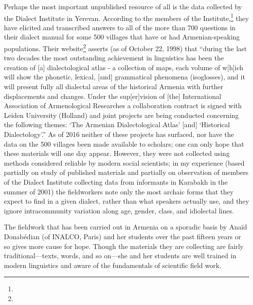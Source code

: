 Perhaps the most important unpublished resource of all is the data collected by the Dialect Institute in Yerevan. According to the members of the Institute,\footnote{} they  have elicited and transcribed answers to all of the more than 700 questions in their dialect manual  for some 500 villages that have or had Armenian-speaking populations. Their website\footnote{}  asserts (as of October 22, 1998) that “during the last two decades the most outstanding achievement in linguistics has been the creation of [a] dialectological atlas - a collection of maps, each volume of w[h]ich will show the phonetic, lexical, [and] grammatical phenomena (isoglosses), and it will present fully all dialectal areas of the historical Armenia with further displacements and changes. Under the sup[er]vision of [the] International Association of Armenological Researches a collaboration contract is signed with Leiden University (Holland) and joint projects are being conducted concerning the following themes: ‘The Armenian Dialectological Atlas’ [and] ‘Historical Dialectology’.” As of 2016 neither of these projects has surfaced, nor have the data on the 500 villages been made available to scholars; one can only hope that these materials will one day appear. However, they were not collected using methods considered reliable by modern social scientists; in my experience (based partially on study of published materials and partially on observation of members of the Dialect Institute collecting data from informants in Karabakh in the summer of 2001) the fieldworkers note only the most archaic forms that they expect to find in a given dialect, rather than what speakers actually use, and they ignore intracommunity variation along age, gender, class, and idiolectal lines.

The fieldwork that has been carried out in Armenia on a sporadic basis by Anaïd Donabédian (of INALCO, Paris) and her students over the past fifteen years or so gives more cause for hope. Though the materials they are collecting are fairly traditional—texts, words, and so on—she and her students are well trained in modern linguistics and aware of the fundamentals of scientific field work.

